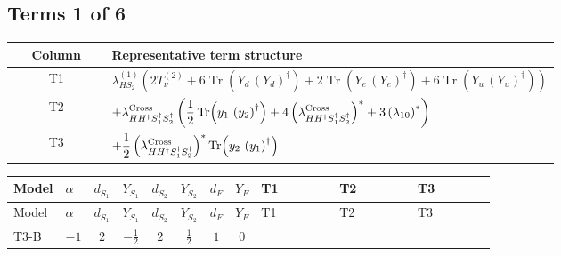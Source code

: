 \documentclass[8pt]{article}
\begin{document}
\begin{landscape}
\subsection*{Terms 1 of 6}
\begin{center}
\begin{tabular}{@{}c >{\raggedright\arraybackslash}p{0.82\linewidth}@{}}
\toprule
Column & Representative term structure \\
\midrule
T1 & \(\displaystyle {\lambda_{HS_2}^{(1)}} (2 T_{\nu}^{(2)}+6 \operatorname{Tr}\!\left({Y_d}\,\left({Y_d}\right)^{\dagger}\right)+2 \operatorname{Tr}\!\left({Y_e}\,\left({Y_e}\right)^{\dagger}\right)+6 \operatorname{Tr}\!\left({Y_u}\,\left({Y_u}\right)^{\dagger}\right))\) \\
\midrule
T2 & \(\displaystyle +{\lambda_{H H^\dagger S_1^\dagger S_2^\dagger}^{\rm Cross}} \left(\frac{1}{2} \operatorname{Tr}\!\left({y_1}\,\left({y_2}\right)^{\dagger}\right)+4 \left({\lambda_{H H^\dagger S_1^\dagger S_2^\dagger}^{\rm Cross}}\right)^{*}+3 \left({\lambda_{10}}\right)^{*}\right)\) \\
\midrule
T3 & \(\displaystyle +\frac{1}{2} \left({\lambda_{H H^\dagger S_1^\dagger S_2^\dagger}^{\rm Cross}}\right)^{*} \operatorname{Tr}\!\left({y_2}\,\left({y_1}\right)^{\dagger}\right)\) \\
\midrule
\bottomrule
\end{tabular}
\end{center}
\smallskip
\tiny
\begin{longtable}{@{}llcccccc >{\raggedright\arraybackslash}p{0.21\linewidth} >{\raggedright\arraybackslash}p{0.21\linewidth} >{\raggedright\arraybackslash}p{0.21\linewidth}@{}}
\toprule
Model & $\alpha$ & $d_{S_1}$ & $Y_{S_1}$ & $d_{S_2}$ & $Y_{S_2}$ & $d_F$ & $Y_F$ & T1 & T2 & T3 \\
\midrule
\endfirsthead
\toprule
Model & $\alpha$ & $d_{S_1}$ & $Y_{S_1}$ & $d_{S_2}$ & $Y_{S_2}$ & $d_F$ & $Y_F$ & T1 & T2 & T3 \\
\midrule
\endhead
T3-B & $-1$ & $2$ & $-\frac{1}{2}$ & $2$ & $\frac{1}{2}$ & $1$ & $0$ & \scriptsize\adjustbox{max width=\linewidth}{$\begin{gathered} {\lambda_{HS_2}^{(1)}} (2 T_{\nu}^{(2)}+6 \operatorname{Tr}\!\left({Y_d}\,\left({Y_d}\right)^{\dagger}\right)+2 \operatorname{Tr}\!\left({Y_e}\,\left({Y_e}\right)^{\dagger}\right)+6 \operatorname{Tr}\!\left({Y_u}\,\left({Y_u}\right)^{\dagger}\right))\end{gathered}$} & \scriptsize\adjustbox{max width=\linewidth}{$\begin{gathered} +{\lambda_{H H^\dagger S_1^\dagger S_2^\dagger}^{\rm Cross}} \left(\frac{1}{2} \operatorname{Tr}\!\left({y_1}\,\left({y_2}\right)^{\dagger}\right)+4 \left({\lambda_{H H^\dagger S_1^\dagger S_2^\dagger}^{\rm Cross}}\right)^{*}+3 \left({\lambda_{10}}\right)^{*}\right)\end{gathered}$} & \scriptsize\adjustbox{max width=\linewidth}{$\begin{gathered} +\frac{1}{2} \left({\lambda_{H H^\dagger S_1^\dagger S_2^\dagger}^{\rm Cross}}\right)^{*} \operatorname{Tr}\!\left({y_2}\,\left({y_1}\right)^{\dagger}\right)\end{gathered}$} \\

\end{longtable}
\end{landscape}
\end{document}
